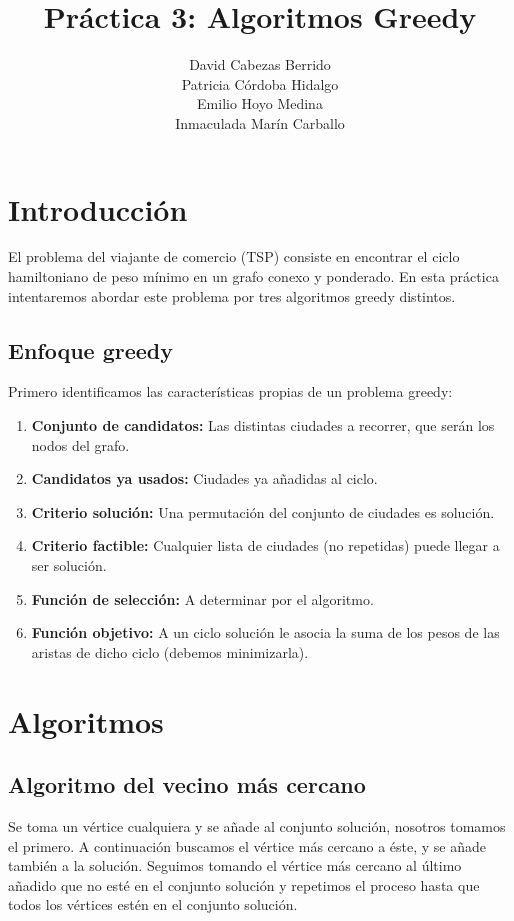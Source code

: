 \documentclass[a4]{article}
\author{David Cabezas Berrido\\ Patricia Córdoba Hidalgo\\ Emilio Hoyo Medina\\ Inmaculada Marín Carballo}
\date{\vspace{-5mm}}
\title{\huge Práctica 3: Algoritmos Greedy \HRule\vspace{-4mm}}
\begin{document}
\maketitle
\vspace{20mm}
\tableofcontents
\newpage

\section{Introducción}

El problema del viajante de comercio (TSP) consiste en encontrar el
ciclo hamiltoniano de peso mínimo en un grafo conexo y ponderado. En
esta práctica intentaremos abordar este problema por tres algoritmos
greedy distintos.

\subsection{Enfoque greedy}

Primero identificamos las características propias de un problema greedy:
\begin{enumerate}
\item \textbf{Conjunto de candidatos:} Las distintas ciudades a
  recorrer, que serán los nodos del grafo.
\item \textbf{Candidatos ya usados:} Ciudades ya añadidas al ciclo.
\item \textbf{Criterio solución:} Una permutación del conjunto de
  ciudades es solución.
\item \textbf{Criterio factible:} Cualquier lista de ciudades (no
  repetidas) puede llegar a ser solución.
\item \textbf{Función de selección:} A determinar por el algoritmo.
\item \textbf{Función objetivo:} A un ciclo solución le asocia la suma de los pesos de las aristas de dicho ciclo (debemos minimizarla).
\end{enumerate}

\section{Algoritmos}

\subsection{Algoritmo del vecino más cercano}

Se toma un vértice cualquiera y se añade al conjunto solución, nosotros
tomamos el primero. A continuación buscamos el vértice más cercano a
éste, y se añade también a la solución. Seguimos tomando el vértice
más cercano al último añadido que no esté en el conjunto
solución y repetimos el proceso hasta que todos los vértices estén en
el conjunto solución.
\end{document}
